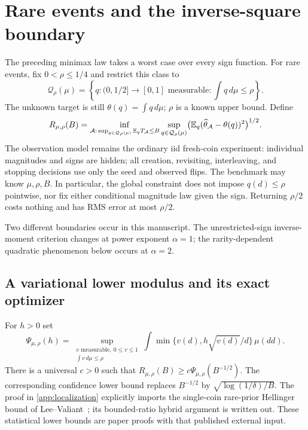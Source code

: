 \section{Rare events and the inverse-square boundary}\label{sec:rare}
The preceding minimax law takes a worst case over every sign function.
For rare events, fix $0<\rho\le1/4$ and restrict this class to
\[
 \mathcal Q_\rho(\mu)=
 \left\{q:(0,1/2]\to[0,1]\text{ measurable}:\int q\,d\mu\le\rho\right\}.
\]
The unknown target is still $\theta(q)=\int q\,d\mu$; $\rho$ is a known
upper bound. Define
\[
 R_{\mu,\rho}(B)=
 \inf_{\mathcal A:\,\sup_{q\in\mathcal Q_\rho(\mu)}\mathbb E_qT_\mathcal A\le B}
 \sup_{q\in\mathcal Q_\rho(\mu)}
       \bigl(\mathbb E_q(\widehat\theta_\mathcal A-\theta(q))^2\bigr)^{1/2}.
\]
The observation model remains the ordinary iid fresh-coin experiment:
individual magnitudes and signs are hidden; all creation, revisiting,
interleaving, and stopping decisions use only the seed and observed flips.
The benchmark may know $\mu,\rho,B$. In particular, the global constraint
does not impose $q(d)\le\rho$ pointwise, nor fix either conditional
magnitude law given the sign. Returning $\rho/2$ costs nothing and has
RMS error at most $\rho/2$.

Two different boundaries occur in this manuscript. The unrestricted-sign
inverse-moment criterion changes at power exponent $\alpha=1$; the
rarity-dependent quadratic phenomenon below occurs at $\alpha=2$.

\subsection{A variational lower modulus and its exact optimizer}
For $h>0$ set
\begin{equation}\label{eq:v5-psi}
 \Psi_{\mu,\rho}(h)=
 \sup_{\substack{v\text{ measurable},\ 0\le v\le1\\\int v\,d\mu\le\rho}}
       \int\min\{v(d),h\sqrt{v(d)}/d\}\,\mu(dd).
\end{equation}
There is a universal $c>0$ such that
$R_{\mu,\rho}(B)\ge c\Psi_{\mu,\rho}(B^{-1/2})$.
The corresponding confidence lower bound replaces $B^{-1/2}$ by
$\sqrt{\log(1/\delta)/B}$. The proof in \cref{app:localization}
explicitly imports the single-coin rare-prior Hellinger bound of
Lee--Valiant~\cite[Corollary 19]{leevaliant}; its bounded-ratio hybrid
argument is written out. These statistical lower bounds are paper
proofs with that published external input.

